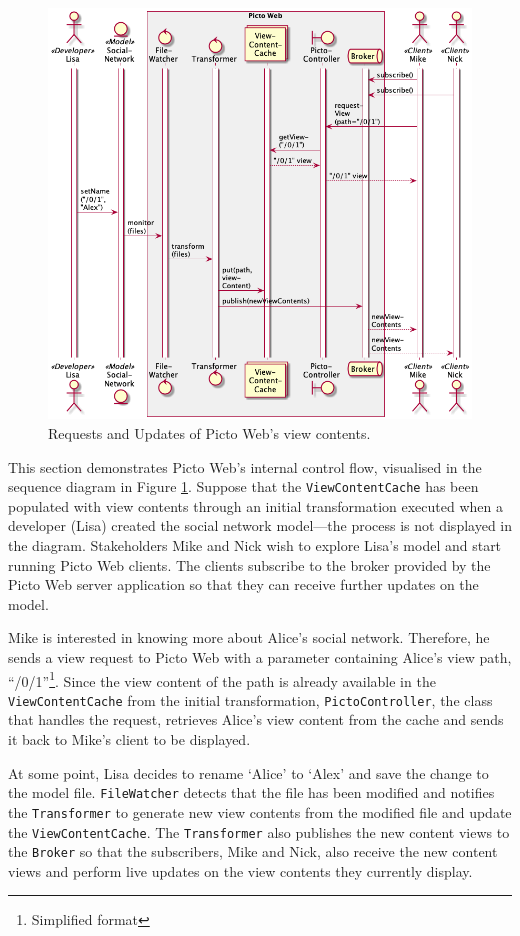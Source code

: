\documentclass[sigconf,review]{acmart}
\begin{document}
\begin{figure}[h]
  \centering
  \includegraphics[width=0.89\linewidth]{images/sequence.png}
  \caption{Requests and Updates of Picto Web's view contents.}
  \label{fig:sequence}
\end{figure}

This section demonstrates Picto Web's internal control flow, visualised in the sequence diagram in Figure \ref{fig:sequence}. Suppose that the \texttt{ViewContentCache} has been populated with view contents through an initial transformation executed when a developer (Lisa) created the social network model---the process is not displayed in the diagram. Stakeholders Mike and Nick wish to explore Lisa's model and start running Picto Web clients. The clients subscribe to the broker provided by the Picto Web server application so that they can receive further updates on the model. 

Mike is interested in knowing more about Alice's social network. Therefore, he sends a view request to Picto Web with a parameter containing Alice's view path, ``/0/1''\footnote{Simplified format}. Since the view content of the path is already available in the \texttt{ViewContentCache} from the initial transformation, \texttt{PictoController}, the class that handles the request, retrieves Alice's view content from the cache and sends it back to Mike's client to be displayed.

At some point, Lisa decides to rename `Alice' to `Alex' and save the change to the model file. \texttt{FileWatcher} detects that the file has been modified and notifies the \texttt{Transformer} to generate new view contents from the modified file and update the \texttt{ViewContentCache}. The \texttt{Transformer} also publishes the new content views to the \texttt{Broker} so that the subscribers, Mike and Nick, also receive the new content views and perform live updates on the view contents they currently display.
\end{document}
